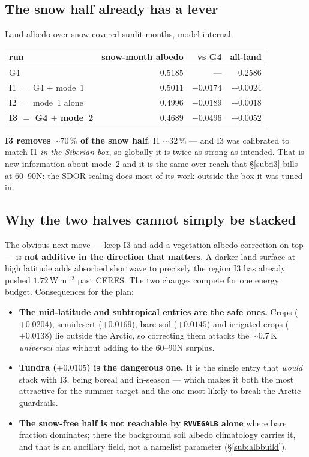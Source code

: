 \documentclass[10pt]{article}
\begin{document}
\subsection{The snow half already has a lever}\label{sub:snowhalflever}
Land albedo over snow-covered sunlit months, model-internal:

\begin{center}\footnotesize
\begin{tabular}{l r r r}
\toprule
run & snow-month albedo & vs G4 & all-land \\
\midrule
G4 & $0.5185$ & --- & $0.2586$ \\
I1 $=$ G4 $+$ mode~1 & $0.5011$ & $-0.0174$ & $-0.0024$ \\
I2 $=$ mode~1 alone & $0.4996$ & $-0.0189$ & $-0.0018$ \\
\textbf{I3 $=$ G4 $+$ mode~2} & $\mathbf{0.4689}$ & $\mathbf{-0.0496}$ & $\mathbf{-0.0052}$ \\
\bottomrule
\end{tabular}
\end{center}

\noindent \textbf{I3 removes ${\sim}70\,\%$ of the snow half}, I1 ${\sim}32\,\%$ --- and I3 was
calibrated to match I1 \emph{in the Siberian box}, so globally it is twice as strong as
intended. That is new information about mode~2 and it is the same over-reach that
\S\ref{sub:i3} bills at 60--90N: the SDOR scaling does most of its work outside the box it was
tuned in.

\subsection{Why the two halves cannot simply be stacked}\label{sub:stacking}
The obvious next move --- keep I3 and add a vegetation-albedo correction on top --- is
\textbf{not additive in the direction that matters}. A darker land surface at high latitude
adds absorbed shortwave to precisely the region I3 has already pushed $1.72$\,W\,m$^{-2}$ past
CERES. The two changes compete for one energy budget. Consequences for the plan:

\begin{itemize}\itemsep2pt
\item \textbf{The mid-latitude and subtropical entries are the safe ones.} Crops
  ($+0.0204$), semidesert ($+0.0169$), bare soil ($+0.0145$) and irrigated crops
  ($+0.0138$) lie outside the Arctic, so correcting them attacks the ${\sim}0.7$\,K
  \emph{universal} bias without adding to the 60--90N surplus.
\item \textbf{Tundra ($+0.0105$) is the dangerous one.} It is the single entry that
  \emph{would} stack with I3, being boreal and in-season --- which makes it both the most
  attractive for the summer target and the one most likely to break the Arctic guardrails.
\item \textbf{The snow-free half is not reachable by \texttt{RVVEGALB} alone} where bare
  fraction dominates; there the background soil albedo climatology carries it, and that is an
  ancillary field, not a namelist parameter (\S\ref{sub:albbuild}).
\end{itemize}
\end{document}
